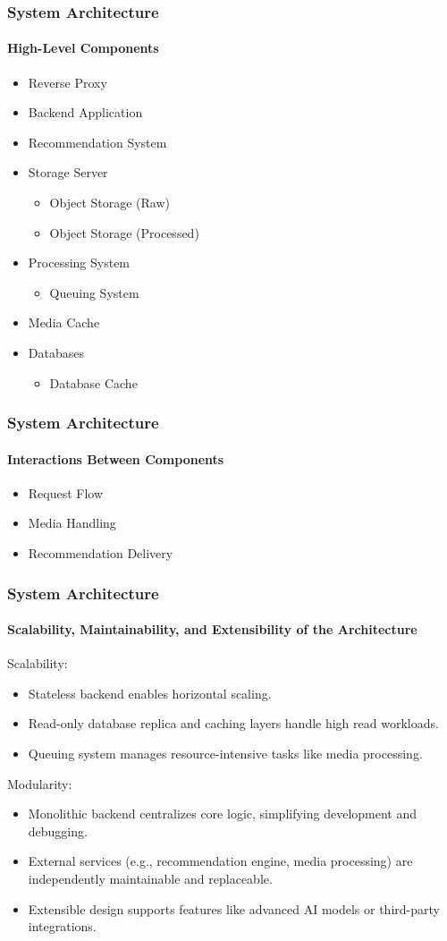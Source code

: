 \documentclass{beamer}
\begin{document}
\begin{frame}
	\frametitle{System Architecture}
	\framesubtitle{High-Level Components}
	\begin{itemize}
		\item Reverse Proxy
		\item Backend Application
		\item Recommendation System
		\item Storage Server
		      \begin{itemize}
			      \item Object Storage (Raw)
			      \item Object Storage (Processed)
		      \end{itemize}
		\item Processing System
		      \begin{itemize}
			      \item Queuing System
		      \end{itemize}
		\item Media Cache
		\item Databases
		      \begin{itemize}
			      \item Database Cache
		      \end{itemize}
	\end{itemize}
\end{frame}

\begin{frame}
	\frametitle{System Architecture}
	\framesubtitle{Interactions Between Components}
	\begin{itemize}
		\item Request Flow
		\item Media Handling
		\item Recommendation Delivery
	\end{itemize}
\end{frame}

\begin{frame}
	\frametitle{System Architecture}
	\framesubtitle{Scalability, Maintainability, and Extensibility of the Architecture}
	Scalability:
	\begin{itemize}
		\item Stateless backend enables horizontal scaling.
		\item Read-only database replica and caching layers handle high read workloads.
		\item Queuing system manages resource-intensive tasks like media processing.
	\end{itemize}
	Modularity:
	\begin{itemize}
		\item Monolithic backend centralizes core logic, simplifying development and debugging.
		\item External services (e.g., recommendation engine, media processing) are independently maintainable and replaceable.
		\item Extensible design supports features like advanced AI models or third-party integrations.
	\end{itemize}
\end{frame}
\end{document}
